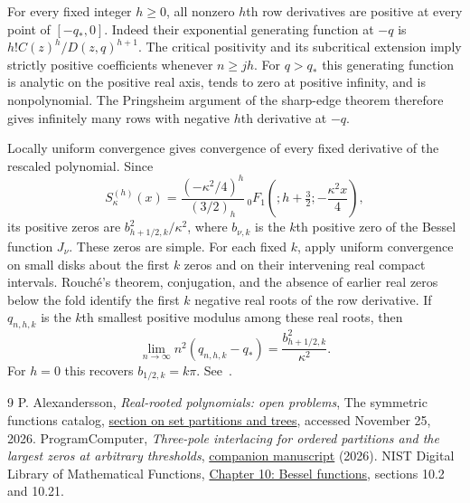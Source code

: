 \documentclass[11pt]{article}
\begin{document}
For every fixed integer $h\ge0$, all nonzero $h$th row derivatives are positive at every point of $[-q_*,0]$. Indeed their exponential generating function at $-q$ is $h!C(z)^h/D(z,q)^{h+1}$. The critical positivity and its subcritical extension imply strictly positive coefficients whenever $n\ge jh$. For $q>q_*$ this generating function is analytic on the positive real axis, tends to zero at positive infinity, and is nonpolynomial. The Pringsheim argument of the sharp-edge theorem therefore gives infinitely many rows with negative $h$th derivative at $-q$.

Locally uniform convergence gives convergence of every fixed derivative of the rescaled polynomial. Since
\[
S_\kappa^{(h)}(x)=
 \frac{(-\kappa^2/4)^h}{(3/2)_h}\,
 {}_0F_1\!\left(;h+\tfrac32;-\frac{\kappa^2 x}{4}\right),
\]
its positive zeros are $b_{h+1/2,k}^2/\kappa^2$, where $b_{\nu,k}$ is the $k$th positive zero of the Bessel function $J_\nu$. These zeros are simple. For each fixed $k$, apply uniform convergence on small disks about the first $k$ zeros and on their intervening real compact intervals. Rouch\'{e}'s theorem, conjugation, and the absence of earlier real zeros below the fold identify the first $k$ negative real roots of the row derivative. If $q_{n,h,k}$ is the $k$th smallest positive modulus among these real roots, then
\[
\lim_{n\to\infty} n^2(q_{n,h,k}-q_*)=\frac{b_{h+1/2,k}^2}{\kappa^2}.
\]
For $h=0$ this recovers $b_{1/2,k}=k\pi$. See~\cite[\S\S10.2, 10.21]{dlmf}.

\begin{thebibliography}{9}
 P. Alexandersson, \emph{Real-rooted polynomials: open problems}, The symmetric functions catalog, \href{https://www.symmetricfunctions.com/realRootedOpenProblems.htm\#openProblemsSetPartitions}{section on set partitions and trees}, accessed November 25, 2026.
 ProgramComputer, \emph{Three-pole interlacing for ordered partitions and the largest zeros at arbitrary thresholds}, \href{https://github.com/ProgramComputer/open-math-research/blob/main/topics/ordered-large-blocks/threshold-three.pdf}{companion manuscript} (2026).
 NIST Digital Library of Mathematical Functions, \href{https://dlmf.nist.gov/10}{Chapter 10: Bessel functions}, sections 10.2 and 10.21.
\end{thebibliography}
\end{document}
